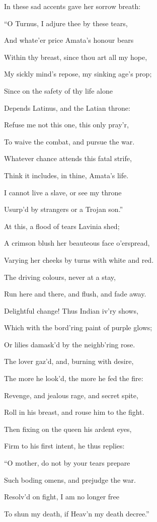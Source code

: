 In these sad accents gave her sorrow breath:

“O Turnus, I adjure thee by these tears,

And whate’er price Amata’s honour bears

Within thy breast, since thou art all my hope,

My sickly mind’s repose, my sinking age’s prop;

Since on the safety of thy life alone

Depends Latinus, and the Latian throne:

Refuse me not this one, this only pray’r,

To waive the combat, and pursue the war.

Whatever chance attends this fatal strife,

Think it includes, in thine, Amata’s life.

I cannot live a slave, or see my throne

Usurp’d by strangers or a Trojan son.”

At this, a flood of tears Lavinia shed;

A crimson blush her beauteous face o’erspread,

Varying her cheeks by turns with white and red.

The driving colours, never at a stay,

Run here and there, and flush, and fade away.

Delightful change! Thus Indian iv’ry shows,

Which with the bord’ring paint of purple glows;

Or lilies damask’d by the neighb’ring rose.

The lover gaz’d, and, burning with desire,

The more he look’d, the more he fed the fire:

Revenge, and jealous rage, and secret spite,

Roll in his breast, and rouse him to the fight.

Then fixing on the queen his ardent eyes,

Firm to his first intent, he thus replies:

“O mother, do not by your tears prepare

Such boding omens, and prejudge the war.

Resolv’d on fight, I am no longer free

To shun my death, if Heav’n my death decree.”

